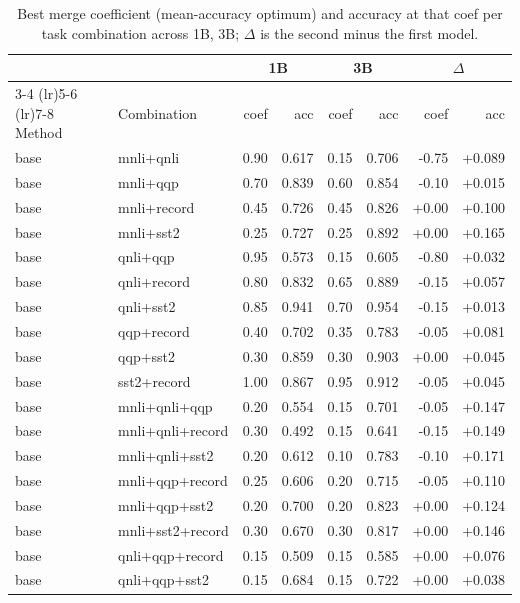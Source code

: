 \begin{table}[t]
  \centering
  \caption{Best merge coefficient (mean-accuracy optimum) and accuracy at that coef per task combination across 1B, 3B; $\Delta$ is the second minus the first model.}
  \label{tab:best-coef-compare}
  \begin{tabular}{llrrrrrr}
    \toprule
    & & \multicolumn{2}{c}{1B} & \multicolumn{2}{c}{3B} & \multicolumn{2}{c}{$\Delta$} \\
    \cmidrule(lr){3-4} \cmidrule(lr){5-6} \cmidrule(lr){7-8}
    Method & Combination & coef & acc & coef & acc & coef & acc \\
    \midrule
    base & mnli+qnli & 0.90 & 0.617 & 0.15 & 0.706 & -0.75 & +0.089 \\
    base & mnli+qqp & 0.70 & 0.839 & 0.60 & 0.854 & -0.10 & +0.015 \\
    base & mnli+record & 0.45 & 0.726 & 0.45 & 0.826 & +0.00 & +0.100 \\
    base & mnli+sst2 & 0.25 & 0.727 & 0.25 & 0.892 & +0.00 & +0.165 \\
    base & qnli+qqp & 0.95 & 0.573 & 0.15 & 0.605 & -0.80 & +0.032 \\
    base & qnli+record & 0.80 & 0.832 & 0.65 & 0.889 & -0.15 & +0.057 \\
    base & qnli+sst2 & 0.85 & 0.941 & 0.70 & 0.954 & -0.15 & +0.013 \\
    base & qqp+record & 0.40 & 0.702 & 0.35 & 0.783 & -0.05 & +0.081 \\
    base & qqp+sst2 & 0.30 & 0.859 & 0.30 & 0.903 & +0.00 & +0.045 \\
    base & sst2+record & 1.00 & 0.867 & 0.95 & 0.912 & -0.05 & +0.045 \\
    base & mnli+qnli+qqp & 0.20 & 0.554 & 0.15 & 0.701 & -0.05 & +0.147 \\
    base & mnli+qnli+record & 0.30 & 0.492 & 0.15 & 0.641 & -0.15 & +0.149 \\
    base & mnli+qnli+sst2 & 0.20 & 0.612 & 0.10 & 0.783 & -0.10 & +0.171 \\
    base & mnli+qqp+record & 0.25 & 0.606 & 0.20 & 0.715 & -0.05 & +0.110 \\
    base & mnli+qqp+sst2 & 0.20 & 0.700 & 0.20 & 0.823 & +0.00 & +0.124 \\
    base & mnli+sst2+record & 0.30 & 0.670 & 0.30 & 0.817 & +0.00 & +0.146 \\
    base & qnli+qqp+record & 0.15 & 0.509 & 0.15 & 0.585 & +0.00 & +0.076 \\
    base & qnli+qqp+sst2 & 0.15 & 0.684 & 0.15 & 0.722 & +0.00 & +0.038 \\

\end{tabular}
\end{table}
